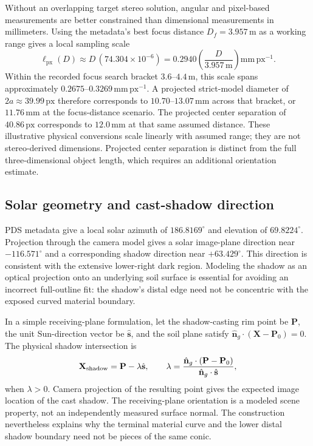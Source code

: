 \documentclass[11pt,letterpaper]{article}
\newcommand{\px}{\,\mathrm{px}}
\newcommand{\mat}[1]{\mathbf{#1}}
\begin{document}
Without an overlapping target stereo solution, angular and pixel-based measurements are better constrained than dimensional measurements in millimeters. Using the metadata's best focus distance \(D_f=3.957\,\mathrm{m}\) as a working range gives a local sampling scale
\begin{equation}
 \ell_{\mathrm{px}}(D)\approx D\,(74.304\times10^{-6})
 = 0.2940\left(\frac{D}{3.957\,\mathrm m}\right)\mathrm{mm\,px^{-1}}.
 \label{eq:scale}
\end{equation}
Within the recorded focus search bracket \(3.6\)--\(4.4\,\mathrm m\), this scale spans approximately \(0.2675\)--\(0.3269\,\mathrm{mm\,px^{-1}}\). A projected strict-model diameter of \(2a\approx39.99\px\) therefore corresponds to \(10.70\)--\(13.07\,\mathrm{mm}\) across that bracket, or \(11.76\,\mathrm{mm}\) at the focus-distance scenario. The projected center separation of \(40.86\px\) corresponds to \(12.0\,\mathrm{mm}\) at that same assumed distance. These illustrative physical conversions scale linearly with assumed range; they are not stereo-derived dimensions. Projected center separation is distinct from the full three-dimensional object length, which requires an additional orientation estimate.

\subsection{Solar geometry and cast-shadow direction}

PDS metadata give a local solar azimuth of \(186.8169^\circ\) and elevation of \(69.8224^\circ\). Projection through the camera model gives a solar image-plane direction near \(-116.571^\circ\) and a corresponding shadow direction near \(+63.429^\circ\). This direction is consistent with the extensive lower-right dark region. Modeling the shadow as an optical projection onto an underlying soil surface is essential for avoiding an incorrect full-outline fit: the shadow's distal edge need not be concentric with the exposed curved material boundary.

In a simple receiving-plane formulation, let the shadow-casting rim point be \(\mat P\), the unit Sun-direction vector be \(\hat{\mat s}\), and the soil plane satisfy \(\hat{\mat n}_g\cdot(\mat X-\mat P_0)=0\). The physical shadow intersection is
\begin{equation}
 \mat X_{\rm shadow}=\mat P-\lambda\hat{\mat s},\qquad
 \lambda=\frac{\hat{\mat n}_g\cdot(\mat P-\mat P_0)}{\hat{\mat n}_g\cdot\hat{\mat s}},
 \label{eq:shadow}
\end{equation}
when \(\lambda>0\). Camera projection of the resulting point gives the expected image location of the cast shadow. The receiving-plane orientation is a modeled scene property, not an independently measured surface normal. The construction nevertheless explains why the terminal material curve and the lower distal shadow boundary need not be pieces of the same conic.
\end{document}
